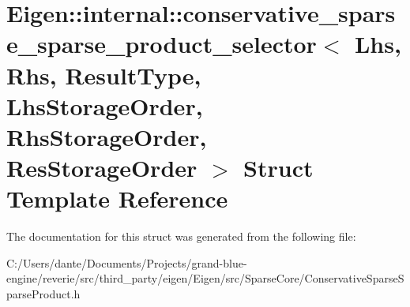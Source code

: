 \hypertarget{struct_eigen_1_1internal_1_1conservative__sparse__sparse__product__selector}{}\section{Eigen\+::internal\+::conservative\+\_\+sparse\+\_\+sparse\+\_\+product\+\_\+selector$<$ Lhs, Rhs, Result\+Type, Lhs\+Storage\+Order, Rhs\+Storage\+Order, Res\+Storage\+Order $>$ Struct Template Reference}
\label{struct_eigen_1_1internal_1_1conservative__sparse__sparse__product__selector}


The documentation for this struct was generated from the following file\+:\begin{DoxyCompactItemize}
\item 
C\+:/\+Users/dante/\+Documents/\+Projects/grand-\/blue-\/engine/reverie/src/third\+\_\+party/eigen/\+Eigen/src/\+Sparse\+Core/Conservative\+Sparse\+Sparse\+Product.\+h\end{DoxyCompactItemize}

